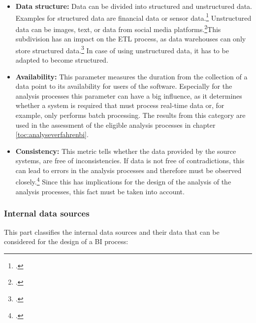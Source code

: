 \begin{itemize}
    \item \textbf{Data structure: }Data can be divided into structured and unstructured data. Examples for
    structured data are financial data or sensor data.\footcite[Cf.][p. 27]{kimble2015big} Unstructured data
    can be images, text, or data from social media platforms.\footcite[Cf.][p. 27]{kimble2015big}This subdivision
    has an impact on the \ac{ETL} process, as data warehouses can only store structured data.\footcite[Cf.][p. 21]{niu2009cognition}
    In case of using unstructured data, it has to be adapted to become structured.
    \item \textbf{Availability: }This parameter measures the duration from the collection of a data point to its
    availability for users of the software. Especially for the analysis processes this parameter can have
    a big influence, as it determines whether a system is required that must process real-time data or, for example, only performs
    batch processing. The results from this category are used in the assessment of the eligible
    analysis processes in chapter \ref{toc:analyseverfahrenbi}.
    \item \textbf{Consistency: }This metric tells whether the data provided by the source systems,
    are free of inconsistencies. If data is not free of contradictions, this can lead to errors in the analysis processes and therefore
    must be observed closely.\footcite[Cf.][p. 561]{huh1990data} Since this has implications for the design of the analysis
    of the analysis processes, this fact must be taken into account.
\end{itemize}

\subsubsection{Internal data sources} \label{toc:internedatenquellen}

This part classifies the internal data sources and their data that can be considered for the design of a \ac{BI} process:

